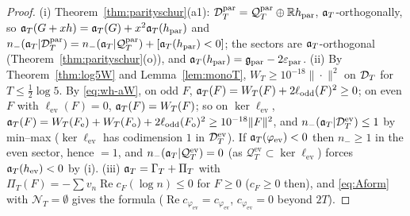 \documentclass[11pt]{amsart}
\theoremstyle{definition}
\theoremstyle{remark}
\newcommand{\R}{\mathbb R}
\newcommand{\Rel}{\operatorname{Re}}
\newcommand{\cF}{c_F}
\newcommand{\NT}{\mathcal N_T}
\newcommand{\PiT}{\Pi_T}
\begin{document}
\begin{proof}
(i) Theorem~\ref{thm:parityschur}(a1): $\DT^{\mathrm{par}}=\mathcal Q^{\mathrm{par}}_T\oplus\R h_{\mathrm{par}}$, $\mathfrak a_T$-orthogonally, so
$\mathfrak a_T(G+xh)=\mathfrak a_T(G)+x^2\mathfrak a_T(h_{\mathrm{par}})$ and $n_-(\mathfrak a_T|\mathcal D_T^{\mathrm{par}})=n_-(\mathfrak a_T|\mathcal Q^{\mathrm{par}}_T)+[\mathfrak a_T(h_{\mathrm{par}})<0]$; the sectors are
$\mathfrak a_T$-orthogonal (Theorem~\ref{thm:parityschur}(o)), and $\mathfrak a_T(h_{\mathrm{par}})=\mathfrak g_{\mathrm{par}}-2\varepsilon_{\mathrm{par}}$.
(ii) By Theorem~\ref{thm:log5W} and Lemma~\ref{lem:monoT}, $W_T\ge10^{-18}\|\cdot\|^2$ on $\mathcal D_T$ for $T\le\frac12\log5$. By \eqref{eq:wh-aW},
on odd $F$, $\mathfrak a_T(F)=W_T(F)+2\ell_{\mathrm{odd}}(F)^2\ge0$; on even $F$ with $\ell_{\mathrm{ev}}(F)=0$, $\mathfrak a_T(F)=W_T(F)$; so on $\ker\ell_{\mathrm{ev}}$,
$\mathfrak a_T(F)=W_T(F_{\mathrm e})+W_T(F_{\mathrm o})+2\ell_{\mathrm{odd}}(F_{\mathrm o})^2\ge10^{-18}\|F\|^2$, and $n_-(\mathfrak a_T|\mathcal D_T^{\mathrm{ev}})\le1$ by min--max
($\ker\ell_{\mathrm{ev}}$ has codimension $1$ in $\mathcal D_T^{\mathrm{ev}}$). If $\mathfrak a_T(\varphi_{\mathrm{ev}})<0$ then $n_-\ge1$ in the even sector, hence $=1$,
and $n_-(\mathfrak a_T|\mathcal Q^{\mathrm{ev}}_T)=0$ (as $\mathcal Q^{\mathrm{ev}}_T\subset\ker\ell_{\mathrm{ev}}$) forces $\mathfrak a_T(h_{\mathrm{ev}})<0$ by (i).
(iii) $\fa=\Gamma_T+\PiT$ with $\PiT(F)=-\sum v_n\Rel\cF(\log n)\le0$ for $F\ge0$ ($\cF\ge0$ then), and \eqref{eq:Aform} with $\NT=\emptyset$
gives the formula ($\Rel c_{\varphi_{\mathrm{ev}}}=c_{\varphi_{\mathrm{ev}}}$, $c_{\varphi_{\mathrm{ev}}}=0$ beyond $2T$).
\end{proof}
\end{document}
